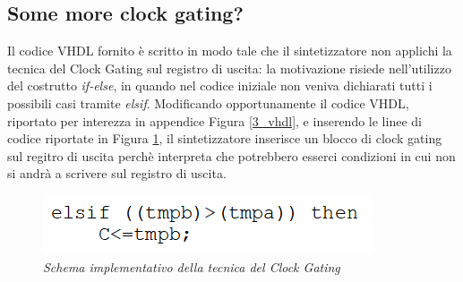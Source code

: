 {\subsection{Some more clock gating?}
Il codice VHDL fornito è scritto in modo tale che il sintetizzatore non applichi la tecnica del Clock Gating sul registro di uscita: la motivazione risiede nell'utilizzo del costrutto \textit{if-else}, in quando nel codice iniziale non veniva dichiarati tutti i possibili casi tramite \textit{elsif}. Modificando opportunamente il codice VHDL,  riportato per interezza in appendice Figura \ref{3_vhdl}, e inserendo le linee di codice riportate in Figura \ref{3_vhdl_2}, il sintetizzatore inserisce un blocco di clock gating sul regitro di uscita perchè interpreta che potrebbero esserci condizioni in cui non si andrà a scrivere sul registro di uscita.
\begin{figure}[!htb]
	\centering
	\includegraphics[scale=1.5]{immagini/3_vhdl_2}
	\caption{\textit{Schema implementativo della tecnica del Clock Gating}}
	\label{3_vhdl_2}
\end{figure}

}
